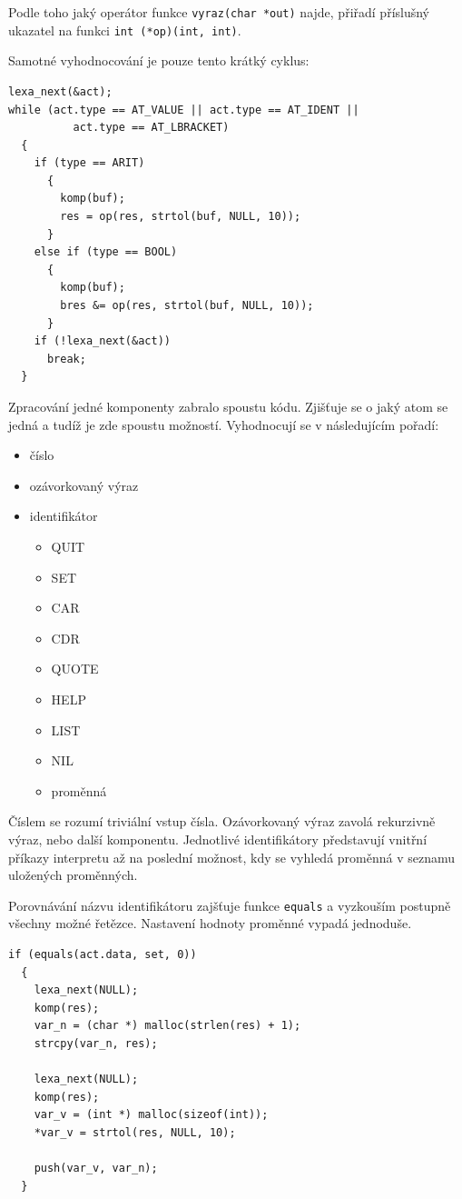 \documentclass[a4paper, 12pt]{article}
\begin{document}
Podle toho jaký operátor funkce \texttt{vyraz(char *out)} najde,
přiřadí příslušný ukazatel na funkci \verb+int (*op)(int, int)+.

Samotné vyhodnocování je pouze tento krátký cyklus:
\begin{lstlisting}
lexa_next(&act);
while (act.type == AT_VALUE || act.type == AT_IDENT ||
          act.type == AT_LBRACKET)
  {
    if (type == ARIT)
      {
        komp(buf);
        res = op(res, strtol(buf, NULL, 10));
      }
    else if (type == BOOL)
      {
        komp(buf);
        bres &= op(res, strtol(buf, NULL, 10));
      }
    if (!lexa_next(&act))
      break;
  }
\end{lstlisting}

Zpracování jedné komponenty zabralo spoustu kódu.  Zjišťuje se o jaký
atom se jedná a tudíž je zde spoustu možností. Vyhodnocují se v
následujícím pořadí:
\begin{itemize}
\item číslo
\item ozávorkovaný výraz
\item identifikátor
\begin{itemize}
\item QUIT
\item SET
\item CAR
\item CDR
\item QUOTE
\item HELP
\item LIST
\item NIL
\item proměnná
\end{itemize}

\end{itemize}

Číslem se rozumí triviální vstup čísla. Ozávorkovaný výraz zavolá
rekurzivně výraz, nebo další komponentu. Jednotlivé identifikátory představují
vnitřní příkazy interpretu až na poslední možnost, kdy se vyhledá
proměnná v seznamu uložených proměnných.

Porovnávání názvu identifikátoru zajšťuje funkce \texttt{equals} a
vyzkouším postupně všechny možné řetězce. Nastavení hodnoty proměnné
vypadá jednoduše.

\begin{lstlisting}
if (equals(act.data, set, 0))
  {
    lexa_next(NULL);
    komp(res);
    var_n = (char *) malloc(strlen(res) + 1);
    strcpy(var_n, res);

    lexa_next(NULL);
    komp(res);
    var_v = (int *) malloc(sizeof(int));
    *var_v = strtol(res, NULL, 10);
	  
    push(var_v, var_n);
  }
\end{lstlisting}
\end{document}
